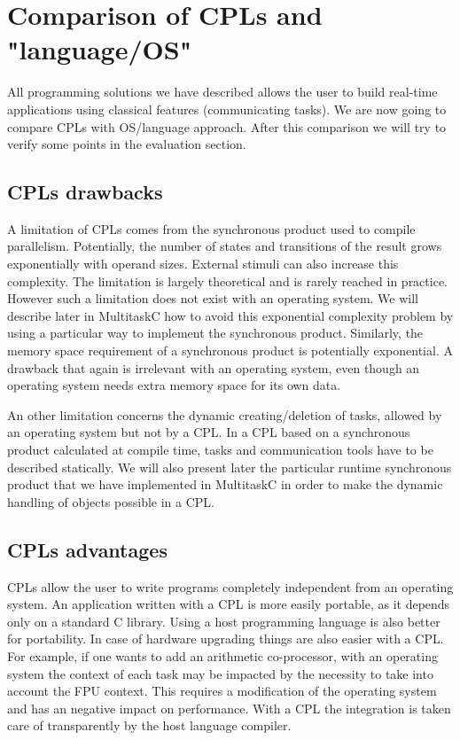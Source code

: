 \documentclass[10pt]{report}
\begin{document}
\section{Comparison of CPLs and "language/OS"}

All programming solutions we have described allows the user to build real-time applications using classical features
(communicating tasks). We are now going to compare CPLs with OS/language approach. After this comparison we will try
to verify some points in the evaluation section.

\subsection{CPLs drawbacks}

A limitation of CPLs comes from the synchronous product used to compile parallelism. Potentially, the number of states and transitions 
of the result grows exponentially with operand sizes. External stimuli can also increase this complexity. The limitation is largely theoretical 
and is rarely reached in practice. However such a limitation does not exist with an operating system. We will describe later in MultitaskC 
how to avoid this exponential complexity problem by using a particular way to implement the synchronous product. Similarly, the memory space requirement 
of a synchronous product is potentially exponential. A drawback that again is irrelevant with an operating system, even though an operating system 
needs extra memory space for its own data.

An other limitation concerns the dynamic creating/deletion of tasks, allowed by an operating system but not by a CPL. In a CPL 
based on a synchronous product calculated at compile time, tasks and communication tools have to be described statically. We will also
present later the particular runtime synchronous product that we have implemented in MultitaskC in order to make the dynamic handling of objects 
possible in a CPL.

\subsection{CPLs advantages}

CPLs allow the user to write programs completely independent from an operating system. An application written with a CPL
is more easily portable, as it depends only on a standard C library. Using a host programming language is also better for portability.
In case of hardware upgrading things are also easier with a CPL. For example, if one wants to add an arithmetic co-processor, 
with an operating system the context of each task may be impacted by the necessity to take into account the FPU context. This requires 
a modification of the operating system and has an negative impact on performance. With a CPL the integration is taken care of transparently 
by the host language compiler.
\end{document}

